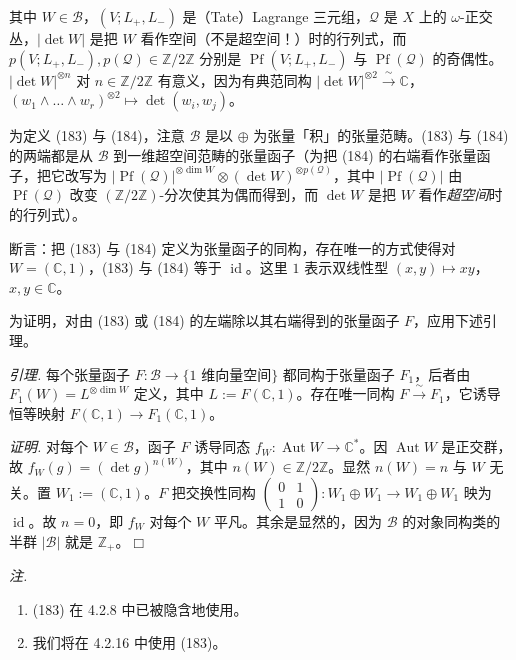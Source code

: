 其中 $W\in\mathcal{B}$，$(V;L_{+},L_{-})$ 是（Tate）Lagrange 三元组，$\mathcal{Q}$ 是 $X$ 上的 $\omega$-正交丛，$|\det W|$ 是把 $W$ 看作空间（不是超空间！）时的行列式，而 $p(V;L_{+},L_{-}),p(\mathcal{Q})\in\mathbb{Z}/2\mathbb{Z}$ 分别是 $\operatorname{Pf}(V;L_{+},L_{-})$ 与 $\operatorname{Pf}(\mathcal{Q})$ 的奇偶性。$|\det W|^{\otimes n}$ 对 $n\in\mathbb{Z}/2\mathbb{Z}$ 有意义，因为有典范同构 $|\det W|^{\otimes 2}\xrightarrow{\ \sim\ }\mathbb{C}$，$(w_{1}\wedge\dots\wedge w_{r})^{\otimes 2}\mapsto\det(w_{i},w_{j})$。

为定义 (183) 与 (184)，注意 $\mathcal{B}$ 是以 $\oplus$ 为张量「积」的张量范畴。(183) 与 (184) 的两端都是从 $\mathcal{B}$ 到一维超空间范畴的张量函子（为把 (184) 的右端看作张量函子，把它改写为 $|\operatorname{Pf}(\mathcal{Q})|^{\otimes\dim W}\otimes(\det W)^{\otimes p(\mathcal{Q})}$，其中 $|\operatorname{Pf}(\mathcal{Q})|$ 由 $\operatorname{Pf}(\mathcal{Q})$ 改变 $(\mathbb{Z}/2\mathbb{Z})$-分次使其为偶而得到，而 $\det W$ 是把 $W$ 看作\emph{超空间}时的行列式）。

断言：把 (183) 与 (184) 定义为张量函子的同构，存在唯一的方式使得对 $W=(\mathbb{C},1)$，(183) 与 (184) 等于 $\operatorname{id}$。这里 $1$ 表示双线性型 $(x,y)\mapsto xy$，$x,y\in\mathbb{C}$。

为证明，对由 (183) 或 (184) 的左端除以其右端得到的张量函子 $F$，应用下述引理。

\emph{引理.} 每个张量函子 $F:\mathcal{B}\to\{1\text{ 维向量空间}\}$ 都同构于张量函子 $F_{1}$，后者由 $F_{1}(W)=L^{\otimes\dim W}$ 定义，其中 $L:=F(\mathbb{C},1)$。存在唯一同构 $F\xrightarrow{\ \sim\ }F_{1}$，它诱导恒等映射 $F(\mathbb{C},1)\to F_{1}(\mathbb{C},1)$。

\emph{证明.} 对每个 $W\in\mathcal{B}$，函子 $F$ 诱导同态 $f_{W}:\operatorname{Aut}W\to\mathbb{C}^{*}$。因 $\operatorname{Aut}W$ 是正交群，故 $f_{W}(g)=(\det g)^{n(W)}$，其中 $n(W)\in\mathbb{Z}/2\mathbb{Z}$。显然 $n(W)=n$ 与 $W$ 无关。置 $W_{1}:=(\mathbb{C},1)$。$F$ 把交换性同构 $\left(\begin{smallmatrix}0&1\\1&0\end{smallmatrix}\right):W_{1}\oplus W_{1}\to W_{1}\oplus W_{1}$ 映为 $\operatorname{id}$。故 $n=0$，即 $f_{W}$ 对每个 $W$ 平凡。其余是显然的，因为 $\mathcal{B}$ 的对象同构类的半群 $|\mathcal{B}|$ 就是 $\mathbb{Z}_{+}$。\hfill$\Box$

\emph{注.}
\begin{enumerate}[label=(\roman*),leftmargin=2.2em]
\item (183) 在 4.2.8 中已被隐含地使用。
\item 我们将在 4.2.16 中使用 (183)。
\end{enumerate}

